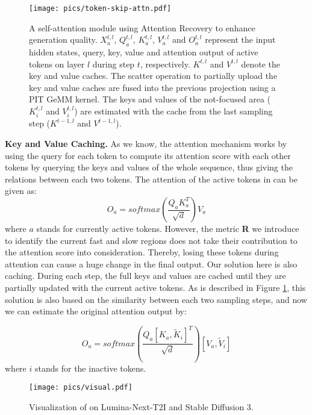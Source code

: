 \noindent \begin{figure}[htbp]
    \centering
\vspace{-0.5cm}    \hspace{-0.2cm}\texttt{[image: pics/token-skip-attn.pdf]} 
    \caption{A \ourmethod{} self-attention module using Attention Recovery to enhance generation quality. $X_a^{t,l}$, $Q_a^{t,l}$, $K_a^{t,l}$, $V_a^{t,l}$ and $O_a^{t,l}$ represent the input hidden states, query, key, value and attention output of active tokens on layer $l$ during step $t$, respectively. $K^{t,l}$ and $V^{t,l}$ denote the key and value caches. The scatter operation to partially upload the key and value caches are fused into the previous projection using a PIT GeMM kernel. The keys and values of the not-focused area 
($K^{t,l}_i$ and $V^{t,l}_i$) are estimated with the cache from the last sampling step ($K^{t-1,l}$ and $V^{t-1,l}$).}
    \label{fig:detail}
\end{figure}

\noindent \textbf{Key and Value Caching.} As we know, the attention mechanism works by using the query for each token to compute its attention score with each other tokens by querying the keys and values of the whole sequence, thus giving the relations between each two tokens. The attention of the active tokens in \ourmethod{} can be given as: 
\begin{equation}
    O_{a} = softmax(\frac{Q_{a}K_{a}^{T}}{\sqrt{d}})V_{a}
\end{equation}
where $a$ stands for currently active tokens.
However, the metric \textbf{R} we introduce to identify the current fast and slow regions does not take their contribution to the attention score into consideration. Thereby, losing these tokens during attention can cause a huge change in the final output. Our solution here is also caching. During each step, the full keys and values are cached until they are partially updated with the current active tokens. As is described in Figure \ref{fig:detail}, this solution is also based on the similarity between each two sampling steps, and now we can estimate the original attention output by: 

\begin{equation}
    O_{a} = softmax(\frac{Q_{a}[K_{a}, \widetilde{K}_i ]^T}{\sqrt{d}})[V_{a}, \widetilde{V}_i ]
\end{equation} 
where $i$ stands for the inactive tokens.

\begin{figure*}[htbp]
    \centering
    \texttt{[image: pics/visual.pdf]} %
    \caption{Visualization of \ourmethod{} on Lumina-Next-T2I and Stable Diffusion 3.}
    \label{fig:visualization}
\end{figure*}

